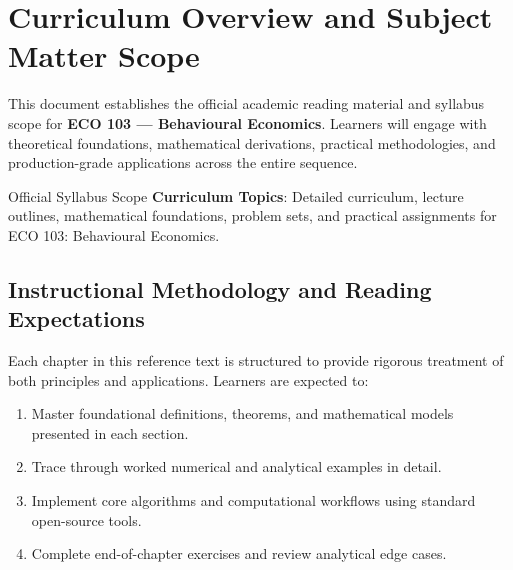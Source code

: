 \section{Curriculum Overview and Subject Matter Scope}

This document establishes the official academic reading material and syllabus scope for \textbf{ECO 103 --- Behavioural Economics}. Learners will engage with theoretical foundations, mathematical derivations, practical methodologies, and production-grade applications across the entire sequence.

\begin{InsightBox}{Official Syllabus Scope}
  \textbf{Curriculum Topics}: Detailed curriculum, lecture outlines, mathematical foundations, problem sets, and practical assignments for ECO 103: Behavioural Economics.
\end{InsightBox}

\subsection{Instructional Methodology and Reading Expectations}

Each chapter in this reference text is structured to provide rigorous treatment of both principles and applications. Learners are expected to:
\begin{enumerate}
  \item Master foundational definitions, theorems, and mathematical models presented in each section.
  \item Trace through worked numerical and analytical examples in detail.
  \item Implement core algorithms and computational workflows using standard open-source tools.
  \item Complete end-of-chapter exercises and review analytical edge cases.
\end{enumerate}

